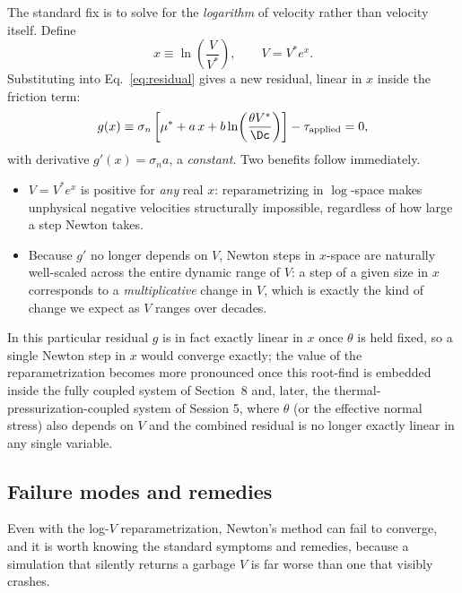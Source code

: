 The standard fix is to solve for the \emph{logarithm} of velocity rather than velocity itself. Define
\begin{equation}
x \equiv \ln\!\left(\frac{V}{V^\ast}\right), \qquad V = V^\ast e^{x}.
\end{equation}
Substituting into Eq.~\eqref{eq:residual} gives a new residual, linear in $x$ inside the friction term:
\begin{equation}
g(x) \equiv \sigma_n\left[\mu^\ast + a\,x + b \ln\!\left(\frac{\theta V^\ast}{\Dc}\right)\right] - \tau_{\mathrm{applied}} = 0,
\end{equation}
with derivative $g'(x) = \sigma_n a$, a \emph{constant}. Two benefits follow immediately.
\begin{itemize}
\item $V = V^\ast e^x$ is positive for \emph{any} real $x$: reparametrizing in $\log$-space makes unphysical negative velocities structurally impossible, regardless of how large a step Newton takes.
\item Because $g'$ no longer depends on $V$, Newton steps in $x$-space are naturally well-scaled across the entire dynamic range of $V$: a step of a given size in $x$ corresponds to a \emph{multiplicative} change in $V$, which is exactly the kind of change we expect as $V$ ranges over decades.
\end{itemize}
In this particular residual $g$ is in fact exactly linear in $x$ once $\theta$ is held fixed, so a single Newton step in $x$ would converge exactly; the value of the reparametrization becomes more pronounced once this root-find is embedded inside the fully coupled system of Section~8 and, later, the thermal-pressurization-coupled system of Session 5, where $\theta$ (or the effective normal stress) also depends on $V$ and the combined residual is no longer exactly linear in any single variable.

\subsection{Failure modes and remedies}

Even with the log-$V$ reparametrization, Newton's method can fail to converge, and it is worth knowing the standard symptoms and remedies, because a simulation that silently returns a garbage $V$ is far worse than one that visibly crashes.

